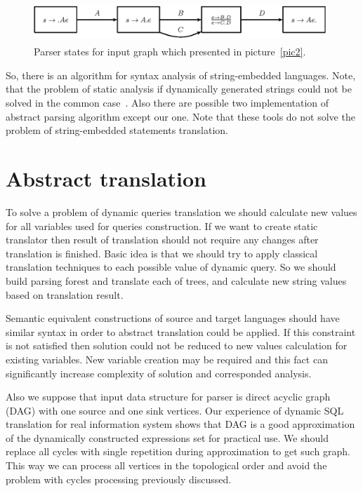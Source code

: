 \documentclass{llncs}
\begin{document}
\begin{figure}
    \begin{center}
        \includegraphics[width=11cm,height=1.5cm]{graphs/simple_grammar_items.eps}
        \caption{Parser states for input graph which presented in picture~\ref{pic2}.}
        \label{pic3}
    \end{center}
\end{figure}

So, there is an algorithm for syntax analysis of string-embedded languages. Note, that the problem of static analysis if dynamically generated strings could not be solved in the common case~\cite{ALVOR2}. Also there are possible two implementation of abstract parsing algorithm except our one. Note that these tools do not solve the problem of string-embedded statements translation.


\section{Abstract translation}
\label{sec:AbstractTranslation}

To solve a problem of dynamic queries translation we should calculate new values for all variables used for queries construction. If we want to create static translator then result of translation should not require any changes after translation is finished. Basic idea is that we should try to apply classical translation techniques to each possible value of dynamic query. So we should build parsing forest and translate each of trees, and calculate new string values based on translation result.

Semantic equivalent constructions of source and target languages should have similar syntax in order to abstract translation could be applied. If this constraint is not satisfied then solution could not be reduced to new values calculation for existing variables. New variable creation may be required and this fact can significantly increase complexity of solution and corresponded analysis.

Also we suppose that input data structure for parser is direct acyclic graph (DAG) with one source and one sink vertices. Our experience of dynamic SQL translation for real information system shows that DAG is a good approximation of the dynamically constructed expressions set for practical use. We should replace all cycles with single repetition during approximation to get such graph. This way we can process all vertices in the topological order and avoid the problem with cycles processing previously discussed.
\end{document}
